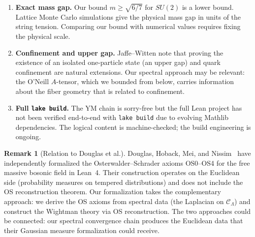 \documentclass[11pt]{article}
\theoremstyle{definition}
\newtheorem{remark}[theorem]{Remark}
\newcommand{\calC}{\mathcal{C}}
\begin{document}
\begin{enumerate}
    \item \textbf{Exact mass gap.} Our bound $m \geq \sqrt{6/7}$ for $SU(2)$ is a lower bound. Lattice Monte Carlo simulations give the physical mass gap in units of the string tension. Comparing our bound with numerical values requires fixing the physical scale.

    \item \textbf{Confinement and upper gap.} Jaffe--Witten \cite{JaffeWitten} note that proving the existence of an isolated one-particle state (an upper gap) and quark confinement are natural extensions. Our spectral approach may be relevant: the O'Neill $A$-tensor, which we bounded from below, carries information about the fiber geometry that is related to confinement.

    \item \textbf{Full \texttt{lake build}.} The YM chain is sorry-free but the full Lean project has not been verified end-to-end with \texttt{lake build} due to evolving Mathlib dependencies. The logical content is machine-checked; the build engineering is ongoing.
\end{enumerate}

\begin{remark}[Relation to Douglas et al.]
Douglas, Hoback, Mei, and Nissim~\cite{Douglas26} have independently formalized the Osterwalder--Schrader axioms OS0--OS4 for the free massive bosonic field in Lean~4. Their construction operates on the Euclidean side (probability measures on tempered distributions) and does not include the OS reconstruction theorem. Our formalization takes the complementary approach: we derive the OS axioms from spectral data (the Laplacian on $\calC_\Lambda$) and construct the Wightman theory via OS reconstruction. The two approaches could be connected: our spectral convergence chain produces the Euclidean data that their Gaussian measure formalization could receive.
\end{remark}
\end{document}
